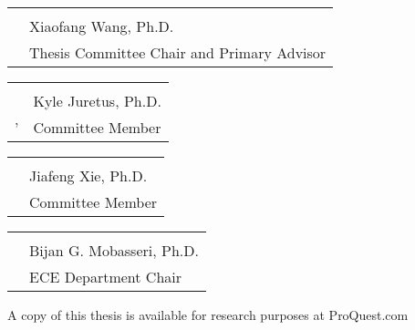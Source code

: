 \begin{tabular}{@{}p{.5in}p{4in}@{}}
& \hrulefill \\
& Xiaofang Wang, Ph.D. \\
& Thesis Committee Chair and Primary Advisor\\
\end{tabular}
\vfill
\begin{tabular}{@{}p{.5in}p{4in}@{}}
& \hrulefill \\
& Kyle Juretus, Ph.D. \\'
& Committee Member\\
\end{tabular}
\vfill
\begin{tabular}{@{}p{.5in}p{4in}@{}}
& \hrulefill \\
& Jiafeng Xie, Ph.D.\\
& Committee Member\\
\end{tabular}
\vfill
\noindent
\vspace{.3in}
\begin{tabular}{@{}p{.5in}p{4in}@{}}
& \hrulefill \\
& Bijan G. Mobasseri, Ph.D. \\
& ECE Department Chair\\
\end{tabular}

\vfill
\noindent
A copy of this thesis is available for research purposes at ProQuest.com
\clearpage
